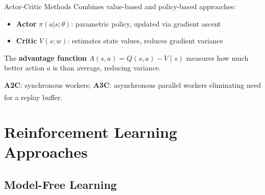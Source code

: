 \begin{v3topic}{Actor-Critic Methods}
        Combines value-based and policy-based approaches:
        \begin{itemize}
            \item \textbf{Actor} $\pi(a|s;\theta)$: parametric policy, updated
                  via gradient ascent
            \item \textbf{Critic} $V(s; w)$: estimates state values, reduces
                  gradient variance
        \end{itemize}
        The \textbf{advantage function} $A(s,a) = Q(s,a) - V(s)$ measures
        how much better action $a$ is than average, reducing variance.

        \textbf{A2C}: synchronous workers; \textbf{A3C}: asynchronous
        parallel workers eliminating need for a replay
        buffer.\textsuperscript{\cite[][p.~362]{hurbansGrokkingArtificialIntelligence2020}}

\end{v3topic}
    \section{Reinforcement Learning Approaches}

    \subsection{Model-Free Learning}

